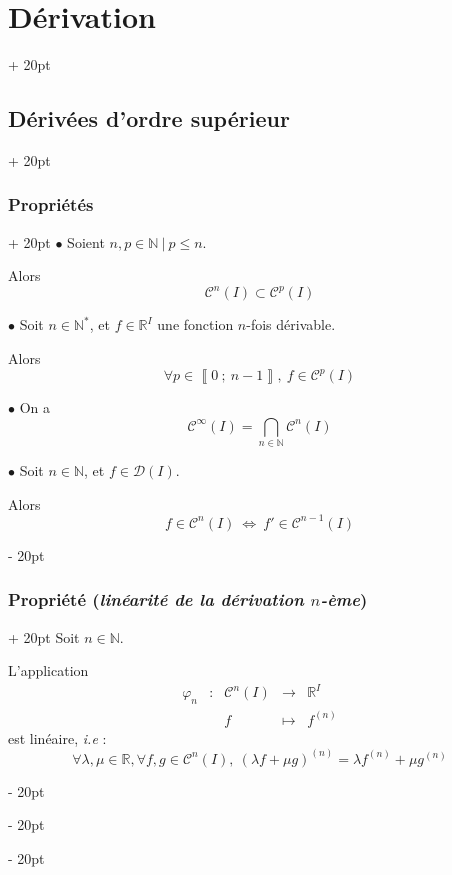 \documentclass[a4paper, 12pt, twoside]{article}
\newcommand{\N}{\mathbb{N}} %
\newcommand{\R}{\mathbb{R}} %
\newcommand{\nset}[2]{\left\llbracket #1\ ;\ #2 \right\rrbracket}
\newcommand{\ssi}{\ \Leftrightarrow \ }
\renewcommand{\le}{\leqslant}
\newcommand{\ind}[1][20pt]{\advance\leftskip + #1}
\newcommand{\deind}[1][20pt]{\advance\leftskip - #1}
\newenvironment{indt}[2][20pt]{#2 \par \ind[#1]}{\par \deind} %
\begin{document}
\begin{indt}{\section{Dérivation}}
\begin{indt}{\subsection{Dérivées d'ordre supérieur}}
            \begin{indt}{\subsubsection{Propriétés}}
                $\bullet$ Soient $n, p \in \N\ |\ p \le n$.

                Alors
                \[
                    \mathcal C^n(I) \subset \mathcal C^p(I)
                \]

                \vspace{6pt}
                
                $\bullet$ Soit $n \in \N^*$, et $f \in \R^I$ une fonction $n$-fois dérivable.

                Alors
                \[
                    \forall p \in \nset{0}{n - 1},\ f \in \mathcal C^p(I)
                \]

                \vspace{6pt}
                
                $\bullet$ On a
                \[
                    \mathcal C^\infty(I) = \bigcap_{n \in \N} \mathcal C^n(I)
                \]

                \vspace{6pt}
                
                $\bullet$ Soit $n \in \N$, et $f \in \mathcal D(I)$.

                Alors
                \[
                     f \in \mathcal C^n(I) \ssi f' \in \mathcal C^{n - 1}(I)
                \]
            \end{indt}

            \vspace{12pt}
            
            \begin{indt}{\subsubsection{Propriété (\textit{linéarité de la dérivation $n$-ème})}}
                Soit $n \in \N$.

                L'application
                \[
                    \begin{array}{rcccc}
                        \varphi_n & : & \mathcal C^n(I) & \longrightarrow & \R^I
                        \\
                        && f & \longmapsto & f^{(n)}
                    \end{array}
                \]
                est linéaire, \textit{i.e} :
                \[
                    \forall \lambda, \mu \in \R, \forall f, g \in \mathcal C^n(I),\
                    (\lambda f + \mu g)^{(n)} = \lambda f^{(n)} + \mu g^{(n)}
                \]
            \end{indt}


\end{indt}
\end{indt}
\end{document}
